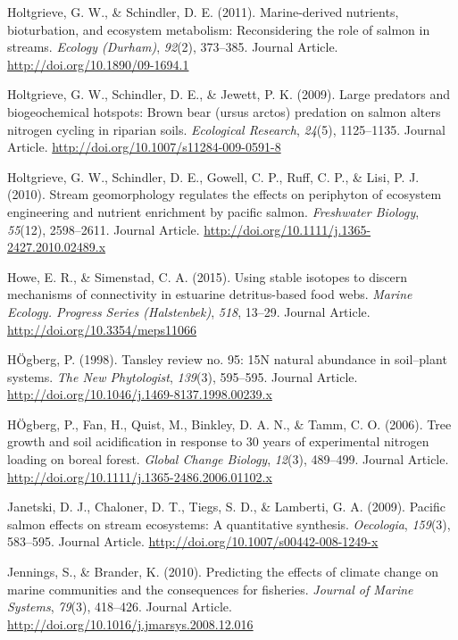 \documentclass [11pt, proquest] {uwthesis}[2015/03/03]
\begin{document}
\hypertarget{ref-Holtgrieve2011}{}
Holtgrieve, G. W., \& Schindler, D. E. (2011). Marine-derived nutrients,
bioturbation, and ecosystem metabolism: Reconsidering the role of salmon
in streams. \emph{Ecology (Durham)}, \emph{92}(2), 373--385. Journal
Article. \url{http://doi.org/10.1890/09-1694.1}

\hypertarget{ref-Holtgrieve2009}{}
Holtgrieve, G. W., Schindler, D. E., \& Jewett, P. K. (2009). Large
predators and biogeochemical hotspots: Brown bear (ursus arctos)
predation on salmon alters nitrogen cycling in riparian soils.
\emph{Ecological Research}, \emph{24}(5), 1125--1135. Journal Article.
\url{http://doi.org/10.1007/s11284-009-0591-8}

\hypertarget{ref-Holtgrieve2010}{}
Holtgrieve, G. W., Schindler, D. E., Gowell, C. P., Ruff, C. P., \&
Lisi, P. J. (2010). Stream geomorphology regulates the effects on
periphyton of ecosystem engineering and nutrient enrichment by pacific
salmon. \emph{Freshwater Biology}, \emph{55}(12), 2598--2611. Journal
Article. \url{http://doi.org/10.1111/j.1365-2427.2010.02489.x}

\hypertarget{ref-Howe2015}{}
Howe, E. R., \& Simenstad, C. A. (2015). Using stable isotopes to
discern mechanisms of connectivity in estuarine detritus-based food
webs. \emph{Marine Ecology. Progress Series (Halstenbek)}, \emph{518},
13--29. Journal Article. \url{http://doi.org/10.3354/meps11066}

\hypertarget{ref-Hogberg1998}{}
HÖgberg, P. (1998). Tansley review no. 95: 15N natural abundance in
soil--plant systems. \emph{The New Phytologist}, \emph{139}(3),
595--595. Journal Article.
\url{http://doi.org/10.1046/j.1469-8137.1998.00239.x}

\hypertarget{ref-Hogberg2006}{}
HÖgberg, P., Fan, H., Quist, M., Binkley, D. A. N., \& Tamm, C. O.
(2006). Tree growth and soil acidification in response to 30 years of
experimental nitrogen loading on boreal forest. \emph{Global Change
Biology}, \emph{12}(3), 489--499. Journal Article.
\url{http://doi.org/10.1111/j.1365-2486.2006.01102.x}

\hypertarget{ref-Janetski2009}{}
Janetski, D. J., Chaloner, D. T., Tiegs, S. D., \& Lamberti, G. A.
(2009). Pacific salmon effects on stream ecosystems: A quantitative
synthesis. \emph{Oecologia}, \emph{159}(3), 583--595. Journal Article.
\url{http://doi.org/10.1007/s00442-008-1249-x}

\hypertarget{ref-Jennings2010}{}
Jennings, S., \& Brander, K. (2010). Predicting the effects of climate
change on marine communities and the consequences for fisheries.
\emph{Journal of Marine Systems}, \emph{79}(3), 418--426. Journal
Article. \url{http://doi.org/10.1016/j.jmarsys.2008.12.016}
\end{document}

